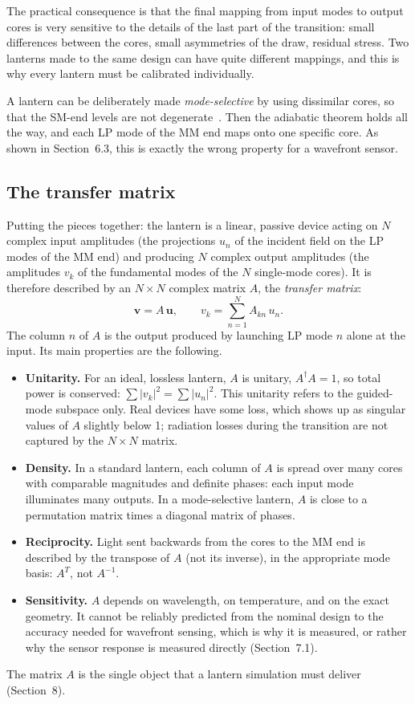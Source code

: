 \documentclass[11pt,a4paper]{article}
\newcommand{\uvec}{\mathbf{u}}
\newcommand{\vvec}{\mathbf{v}}
\begin{document}
The practical consequence is that the final mapping from input modes to output cores is very sensitive to the details of the last part of the transition: small differences between the cores, small asymmetries of the draw, residual stress. Two lanterns made to the same design can have quite different mappings, and this is why every lantern must be calibrated individually.

A lantern can be deliberately made \emph{mode-selective} by using dissimilar cores, so that the SM-end levels are not degenerate~\cite{LeonSaval2014}. Then the adiabatic theorem holds all the way, and each LP mode of the MM end maps onto one specific core. As shown in Section~6.3, this is exactly the wrong property for a wavefront sensor.

\subsection{The transfer matrix}
Putting the pieces together: the lantern is a linear, passive device acting on $N$ complex input amplitudes (the projections $u_n$ of the incident field on the LP modes of the MM end) and producing $N$ complex output amplitudes (the amplitudes $v_k$ of the fundamental modes of the $N$ single-mode cores). It is therefore described by an $N \times N$ complex matrix $A$, the \emph{transfer matrix}:
\begin{equation}
\vvec = A\, \uvec,
\qquad
v_k = \sum_{n=1}^{N} A_{kn}\, u_n.
\label{eq:transfer}
\end{equation}
The column $n$ of $A$ is the output produced by launching LP mode $n$ alone at the input. Its main properties are the following.
\begin{itemize}
\item \textbf{Unitarity.} For an ideal, lossless lantern, $A$ is unitary, $A^\dagger A = 1$, so total power is conserved: $\sum |v_k|^2 = \sum |u_n|^2$. This unitarity refers to the guided-mode subspace only. Real devices have some loss, which shows up as singular values of $A$ slightly below 1; radiation losses during the transition are not captured by the $N \times N$ matrix.
\item \textbf{Density.} In a standard lantern, each column of $A$ is spread over many cores with comparable magnitudes and definite phases: each input mode illuminates many outputs. In a mode-selective lantern, $A$ is close to a permutation matrix times a diagonal matrix of phases.
\item \textbf{Reciprocity.} Light sent backwards from the cores to the MM end is described by the transpose of $A$ (not its inverse), in the appropriate mode basis: $A^T$, not $A^{-1}$.
\item \textbf{Sensitivity.} $A$ depends on wavelength, on temperature, and on the exact geometry. It cannot be reliably predicted from the nominal design to the accuracy needed for wavefront sensing, which is why it is measured, or rather why the sensor response is measured directly (Section~7.1).
\end{itemize}
The matrix $A$ is the single object that a lantern simulation must deliver (Section~8).
\end{document}
